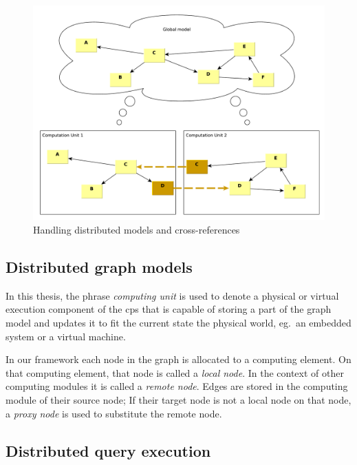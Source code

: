 \begin{figure}[h]
	\begin{center}
		\includegraphics[width=\textwidth]{figures/distributed-model-handling.pdf}
		\caption{Handling distributed models and cross-references}
		\label{fig:distributed-model-handling}
	\end{center}
\end{figure}



\subsection{Distributed graph models}

In this thesis, the phrase \emph{computing unit} is used to denote a physical or virtual execution component of the cps that is capable of storing a part of the graph model and updates it to fit the current state the physical world, eg.\ an embedded system or a virtual machine.

In our framework each node in the graph is allocated to a computing element. 
On that computing element, that node is called a \emph{local node}. 
In the context of other computing modules it is called a \emph{remote node}. 
Edges are stored in the computing module of their source node; 
If their target node is not a local node on that node, a \emph{proxy node} is used to substitute the remote node.


\subsection{Distributed query execution}

